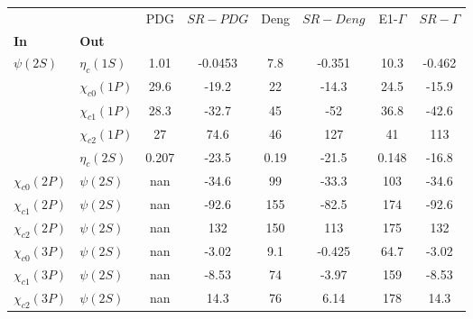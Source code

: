 \begin{tabular}{l|l|c|c|c|c|c|c}
\toprule
                &            &   PDG & $SR-PDG$ &  Deng & $SR-Deng$ &  E1-$\Gamma$ & $SR-\Gamma$ \\
\textbf{In} & \textbf{Out} &       &          &       &           &              &             \\
\midrule
\textbf{$\psi(2S)$} & \textbf{$\eta_{c}(1S)$} &  1.01 &  -0.0453 &   7.8 &    -0.351 &         10.3 &      -0.462 \\
                & \textbf{$\chi_{c0}(1P)$} &  29.6 &    -19.2 &    22 &     -14.3 &         24.5 &       -15.9 \\
                & \textbf{$\chi_{c1}(1P)$} &  28.3 &    -32.7 &    45 &       -52 &         36.8 &       -42.6 \\
                & \textbf{$\chi_{c2}(1P)$} &    27 &     74.6 &    46 &       127 &           41 &         113 \\
                & \textbf{$\eta_{c}(2S)$} & 0.207 &    -23.5 &  0.19 &     -21.5 &        0.148 &       -16.8 \\
\textbf{$\chi_{c0}(2P)$} & \textbf{$\psi(2S)$} &   nan &    -34.6 &    99 &     -33.3 &          103 &       -34.6 \\
\textbf{$\chi_{c1}(2P)$} & \textbf{$\psi(2S)$} &   nan &    -92.6 &   155 &     -82.5 &          174 &       -92.6 \\
\textbf{$\chi_{c2}(2P)$} & \textbf{$\psi(2S)$} &   nan &      132 &   150 &       113 &          175 &         132 \\
\textbf{$\chi_{c0}(3P)$} & \textbf{$\psi(2S)$} &   nan &    -3.02 &   9.1 &    -0.425 &         64.7 &       -3.02 \\
\textbf{$\chi_{c1}(3P)$} & \textbf{$\psi(2S)$} &   nan &    -8.53 &    74 &     -3.97 &          159 &       -8.53 \\
\textbf{$\chi_{c2}(3P)$} & \textbf{$\psi(2S)$} &   nan &     14.3 &    76 &      6.14 &          178 &        14.3 \\
\bottomrule
\end{tabular}
